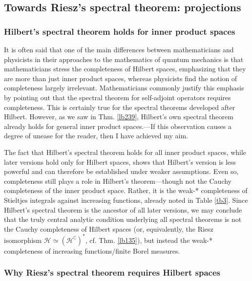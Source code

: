\documentclass[12pt,b5paper,notitlepage]{article}
\theoremstyle{definition}
\theoremstyle{plain}
\newcommand{\mc}{\mathcal}
\newcommand{\Co}{\complement}
\numberwithin{equation}{section}
\begin{document}
\subsection{Towards Riesz's spectral theorem: projections}\label{lb258}


\subsubsection{Hilbert's spectral theorem holds for inner product spaces}


It is often said that one of the main differences between mathematicians and physicists in their approaches to the mathematics of quantum mechanics is that mathematicians stress the completeness of Hilbert spaces, emphasizing that they are more than just inner product spaces, whereas physicists find the notion of completeness largely irrelevant. Mathematicians commonly justify this emphasis by pointing out that the spectral theorem for self-adjoint operators requires completeness. This is certainly true for the spectral theorems developed after Hilbert. However, as we saw in Thm. \ref{lb239}, Hilbert's own spectral theorem already holds for general inner product spaces.---If this observation causes a degree of unease for the reader, then I have achieved my aim.




The fact that Hilbert's spectral theorem holds for all inner product spaces, while later versions hold only for Hilbert spaces, shows that Hilbert's version is less powerful and can therefore be established under weaker assumptions. Even so, completeness still plays a role in Hilbert's theorem---though not the Cauchy completeness of the inner product space. Rather, it is the weak-* completeness of Stieltjes integrals against increasing functions, already noted in Table \ref{tb3}. Since Hilbert's spectral theorem is the ancestor of all later versions, we may conclude that the truly central analytic condition underlying all spectral theorems is not the Cauchy completeness of Hilbert spaces (or, equivalently, the Riesz isomorphism $\mc H\simeq (\mc H^\Co)^*$, cf. Thm. \ref{lb135}), but instead the weak-* completeness of increasing functions/finite Borel measures.





\subsubsection{Why Riesz’s spectral theorem requires Hilbert spaces}\label{lb260}
\end{document}
